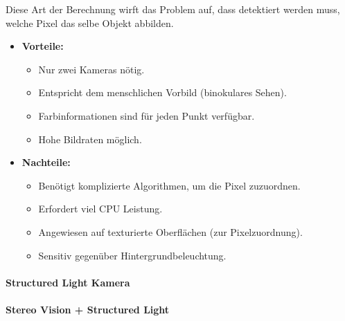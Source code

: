 					Diese Art der Berechnung wirft das Problem auf, dass detektiert werden muss, welche Pixel das selbe Objekt abbilden.
					
					\begin{itemize}
						\item \textbf{Vorteile:}
							\begin{itemize}
								\item Nur zwei Kameras nötig.
								\item Entspricht dem menschlichen Vorbild (binokulares Sehen).
								\item Farbinformationen sind für jeden Punkt verfügbar.
								\item Hohe Bildraten möglich.
							\end{itemize}
						\item \textbf{Nachteile:}
							\begin{itemize}
								\item Benötigt komplizierte Algorithmen, um die Pixel zuzuordnen.
								\item Erfordert viel CPU Leistung.
								\item Angewiesen auf texturierte Oberflächen (zur Pixelzuordnung).
								\item Sensitiv gegenüber Hintergrundbeleuchtung.
							\end{itemize}
					\end{itemize}

				\paragraph{Structured Light Kamera} %

				\paragraph{Stereo Vision + Structured Light} %

